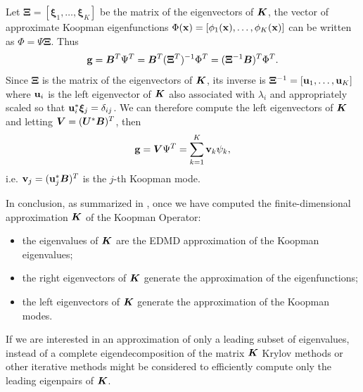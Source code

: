 Let $\bm{\Xi} = \left[\bm{\xi}_1,\dots,\bm{\xi}_K\right]$ be the matrix of the eigenvectors of $\vb*{K}$, the vector of approximate Koopman eigenfunctions $\Phi(\vb{x}) = \left[\phi_1(\vb{x}), \dots, \phi_K(\vb{x})\right]$ can be written as $\Phi = \Psi\bm{\Xi}$. Thus
\begin{equation}
    \vb{g} = \vb*{B}^T\Psi^T = \vb*{B}^T(\bm{\Xi}^T)^{-1}\Phi^T = (\bm{\Xi}^{-1}\vb*{B})^T\Phi^T.
\end{equation}
Since $\bm{\Xi}$ is the matrix of the eigenvectors of $\vb*{K}$, its inverse is $\bm{\Xi}^{-1} = \left[\vb{u}_1, \dots, \vb{u}_K\right]$ where $\vb{u}_i$ is the left eigenvector of $\vb*{K}$ also associated with $\lambda_i$ and appropriately scaled so that $\vb{u}_i^*\bm{\xi}_j = \delta_{ij}$. We can therefore compute the left eigenvectors of $\vb*{K}$ and letting  $\vb*{V} = (\vb*{U}^*\vb*{B})^T$, then
\begin{equation}
    \vb{g} = \vb*{V}\Psi^T = \sum_{k=1}^K \vb{v}_k\psi_k,
\end{equation}
i.e. $\vb{v}_j = (\vb{u}_j^*\vb*{B})^T$ is the $j$-th Koopman mode.

In conclusion, as summarized in ,  once we have computed the finite-dimensional approximation $\vb*{K}$ of the Koopman Operator:
\begin{itemize}
    \item the eigenvalues of $\vb*{K}$ are the EDMD approximation of the Koopman eigenvalues;
    \item the right eigenvectors of $\vb*{K}$ generate the approximation of the eigenfunctions;
    \item the left eigenvectors of $\vb*{K}$ generate the approximation of the Koopman modes.
\end{itemize}
If we are interested in an approximation of only a leading subset of eigenvalues, instead of a complete eigendecomposition of the matrix $\vb*{K}$ Krylov methods or other iterative methods might be considered to efficiently compute only the leading eigenpairs of $\vb*{K}$.

